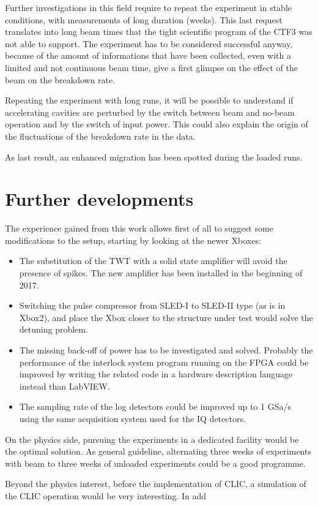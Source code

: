 Further investigations in this field require to repeat the experiment in stable conditions, with measurements of long duration (weeks). This last request translates into long beam times that the tight scientific program of the CTF3 was not able to support. The experiment has to be considered successful anyway, because of the amount of informations that have been collected, even with a limited and not continuous beam time, give a first glimpse on the effect of the beam on the breakdown rate.

Repeating the experiment with long runs, it will be possible to understand if accelerating cavities are perturbed by the switch between beam and no-beam operation and by the switch of input power. This could also explain the origin of the fluctuations of the breakdown rate in the data.

As last result, an enhanced migration has been spotted during the loaded runs. 



\section[Further developments]{Further developments}

The experience gained from this work allows first of all to suggest some modifications to the setup, starting by looking at the newer Xboxes:
\begin{itemize}
\item The substitution of the TWT with a solid state amplifier will avoid the presence of spikes. The new amplifier has been installed in the beginning of 2017.
\item Switching the pulse compressor from SLED-I to SLED-II type (as is in Xbox2), and place the Xbox closer to the structure under test would solve the detuning problem.
\item The missing back-off of power has to be investigated and solved. Probably the performance of the interlock system program running on the FPGA could be improved by writing the related code in a hardware description language instead than LabVIEW.
\item The sampling rate of the log detectors could be improved up to 1 GSa/s using the same acquisition system used for the IQ detectors.
\end{itemize}

On the physics side, pursuing the experiments in a dedicated facility would be the optimal solution. As general guideline, alternating three weeks of experiments with beam to three weeks of unloaded experiments could be a good programme.

Beyond the physics interest, before the implementation of CLIC, a simulation of the CLIC operation would be very interesting. In add













